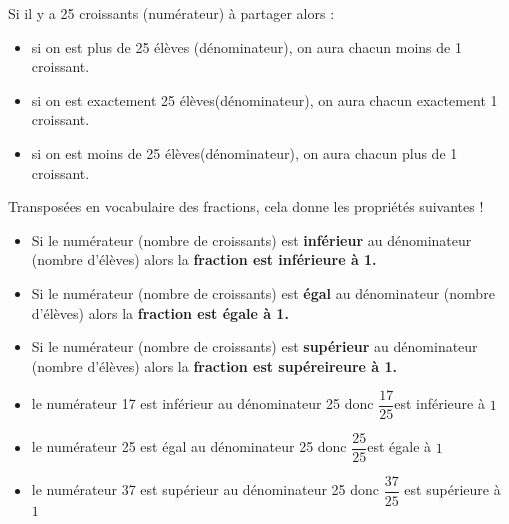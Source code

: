 \begin{remarque}

    Si il y a 25 croissants (numérateur) à partager alors :    
    \begin{itemize}
        \item si on est plus de 25 élèves (dénominateur), on aura chacun moins de 1 croissant.
        \item si on est exactement 25 élèves(dénominateur), on aura chacun exactement 1 croissant.
        \item si on est moins de 25 élèves(dénominateur), on aura chacun plus de 1 croissant.
    \end{itemize}

    \smallskip
    Transposées en vocabulaire des fractions, cela donne les propriétés suivantes ! 
\end{remarque}

{\renewcommand{\StringPROPRIETE}{PROPRI\'ET\'ES}
\begin{propriete}[\admises]
    \begin{itemize}
        \item Si le numérateur (nombre de croissants) est \textbf{inférieur} au dénominateur (nombre d'élèves) alors la \textbf{fraction est inférieure à 1.}
        \item Si le numérateur (nombre de croissants) est \textbf{égal} au dénominateur (nombre d'élèves) alors la \textbf{fraction est égale à 1.}
        \item Si le numérateur (nombre de croissants) est \textbf{supérieur} au dénominateur (nombre d'élèves) alors la \textbf{fraction est supéreireure à 1.}
    \end{itemize}
\end{propriete}
}

\begin{exemples*1}
    \begin{itemize}
        \item le numérateur 17 est inférieur au dénominateur 25 donc $\dfrac{17}{25}$est inférieure à $1$
        \item le numérateur 25 est égal au dénominateur 25 donc $\dfrac{25}{25}$est égale à $1$
        \item le numérateur 37 est supérieur au dénominateur 25 donc $\dfrac{37}{25}$ est supérieure à $1$
    \end{itemize}
\end{exemples*1}


